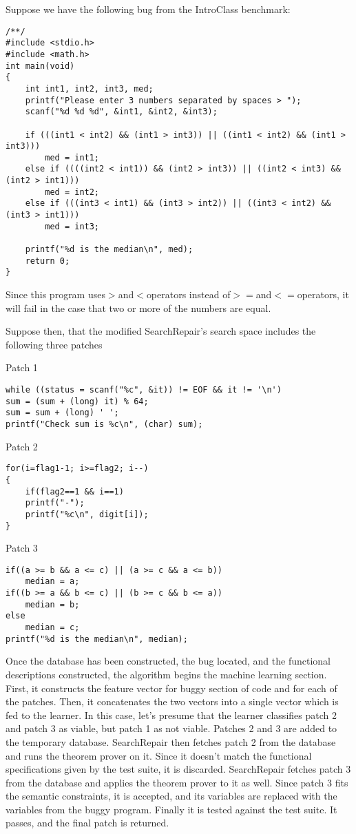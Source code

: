 \documentclass[conference]{IEEEtran}
\begin{document}
Suppose we have the following bug from the IntroClass benchmark: 

\begin{lstlisting}
/**/
#include <stdio.h>
#include <math.h>
int main(void)
{
	int int1, int2, int3, med; 
	printf("Please enter 3 numbers separated by spaces > ");
	scanf("%d %d %d", &int1, &int2, &int3);

	if (((int1 < int2) && (int1 > int3)) || ((int1 < int2) && (int1 > int3)))
	 	med = int1;
	else if ((((int2 < int1)) && (int2 > int3)) || ((int2 < int3) && (int2 > int1)))
        med = int2;
	else if (((int3 < int1) && (int3 > int2)) || ((int3 < int2) && (int3 > int1)))
	    med = int3;
    
    printf("%d is the median\n", med);
	return 0;
}                                             
\end{lstlisting}

Since this program uses$ > $and$ < $operators instead of$ >= $and$ <= $operators, it will fail in the case that two or more of the numbers are equal. 

Suppose then, that the modified SearchRepair's search space includes the following three patches

Patch 1
\begin{lstlisting}
while ((status = scanf("%c", &it)) != EOF && it != '\n') 
sum = (sum + (long) it) % 64;
sum = sum + (long) ' ';
printf("Check sum is %c\n", (char) sum);                                             
\end{lstlisting}

Patch 2
\begin{lstlisting}
for(i=flag1-1; i>=flag2; i--)
{ 
	if(flag2==1 && i==1)
	printf("-");
	printf("%c\n", digit[i]);
}
\end{lstlisting}

Patch 3
\begin{lstlisting}
if((a >= b && a <= c) || (a >= c && a <= b))
	median = a;
if((b >= a && b <= c) || (b >= c && b <= a))
	median = b;
else
	median = c;
printf("%d is the median\n", median);
\end{lstlisting}

Once the database has been constructed, the bug located, and the functional descriptions constructed, the algorithm begins the machine learning section.
 First, it constructs the feature vector for buggy section of code and for each of the patches. 
 Then, it concatenates the two vectors into a single vector which is fed to the learner. 
 In this case, let's presume that the learner classifies patch 2 and patch 3 as viable, but patch 1 as not viable.
  Patches 2 and 3 are added to the temporary database. 
  SearchRepair then fetches patch 2 from the database and runs the theorem prover on it.
   Since it doesn't match the functional specifications given by the test suite, it is discarded.
    SearchRepair fetches patch 3 from the database and applies the theorem prover to it as well.
     Since patch 3 fits the semantic constraints, it is accepted, and its variables are replaced with the variables from the buggy program.
      Finally it is tested against the test suite. 
      It passes, and the final patch is returned.
\end{document}
